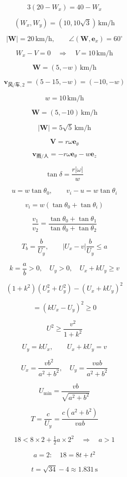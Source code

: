 \documentclass[12pt]{article}
\begin{document}
\[
3(20-W_x)=40-W_x
\]

\[
\boxed{(W_x,W_y)=(10,10\sqrt3)\,\mathrm{km/h}}
\]

\[
|\bm W|=20\,\mathrm{km/h},\qquad \angle(\bm W,\bm e_x)=60^\circ
\]

\[
W_x-V=0\quad\Longrightarrow\quad\boxed{V=10\,\mathrm{km/h}}
\]

\[
\bm W=(5,-w)\,\mathrm{km/h}
\]

\[
\bm v_{\text{风/车},2}=(5-15,-w)=(-10,-w)
\]

\[
w=10\,\mathrm{km/h}
\]

\[
\boxed{\bm W=(5,-10)\,\mathrm{km/h}}
\]

\[
\boxed{|\bm W|=5\sqrt5\,\mathrm{km/h}}
\]

\[
\bm V=r\omega\bm e_\theta
\]

\[
\bm v_{\text{雨/人}}=-r\omega\bm e_\theta-w\bm e_z
\]

\[
\boxed{\tan\delta=\frac{r|\omega|}{w}}
\]

\[
u=w\tan\theta_0,\qquad v_i-u=w\tan\theta_i
\]

\[
v_i=w(\tan\theta_0+\tan\theta_i)
\]

\[
\boxed{\frac{v_1}{v_2}=\frac{\tan\theta_0+\tan\theta_1}{\tan\theta_0+\tan\theta_2}}
\]

\[
T_b=\frac b{U_y},\qquad |U_x-v|\frac b{U_y}\le a
\]

\[
k=\frac ab>0,\quad U_y>0,\quad U_x+kU_y\ge v
\]

\[
(1+k^2)(U_x^2+U_y^2)-(U_x+kU_y)^2
\]

\[
=(kU_x-U_y)^2\ge0
\]

\[
\boxed{U^2\ge\frac{v^2}{1+k^2}}
\]

\[
U_y=kU_x,\qquad U_x+kU_y=v
\]

\[
\boxed{U_x=\frac{vb^2}{a^2+b^2},\quad U_y=\frac{vab}{a^2+b^2}}
\]

\[
\boxed{U_{\min}=\frac{vb}{\sqrt{a^2+b^2}}}
\]

\[
\boxed{T=\frac c{U_y}=\frac{c(a^2+b^2)}{vab}}
\]

\[
18<8\times2+\tfrac12a\times2^2\quad\Longrightarrow\quad a>1
\]

\[
a=2:\quad18=8t+t^2
\]

\[
t=\sqrt{34}-4\approx1.831\,\mathrm s
\]
\end{document}
